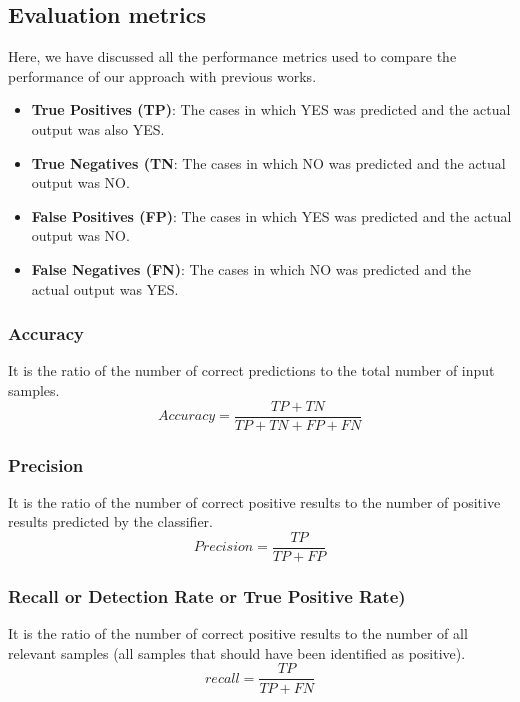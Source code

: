\documentclass[14pt, conference]{IEEEtran}
\begin{document}
\subsection{Evaluation metrics}
Here, we have discussed all the performance metrics used to compare the performance of our approach with previous works.

\begin{itemize}
    \item \textbf{True Positives (TP)}: The cases in which YES was predicted and the actual output was also YES.
    \item \textbf{True Negatives (TN}: The cases in which NO was predicted and the actual output was NO.
    \item \textbf{False Positives (FP)}: The cases in which YES was predicted and the actual output was NO.
    \item \textbf{False Negatives (FN)}: The cases in which NO was predicted and the actual output was YES.
\end{itemize}

\subsubsection{Accuracy}
It is the ratio of the number of correct predictions to the total number of input samples.
\begin{equation}
    Accuracy = \frac{TP+TN}{TP+TN+FP+FN}
\end{equation}

\subsubsection{Precision}
It is the ratio of the number of correct positive results to the number of positive results predicted by the classifier.
\begin{equation}
    Precision = \frac{TP}{TP+FP}
\end{equation}

\subsubsection{Recall or Detection Rate or True Positive Rate)}
It is the ratio of the number of correct positive results to the number of all relevant samples (all samples that should
have been identified as positive).
\begin{equation}
    recall = \frac{TP}{TP+FN}
\end{equation}
\end{document}
